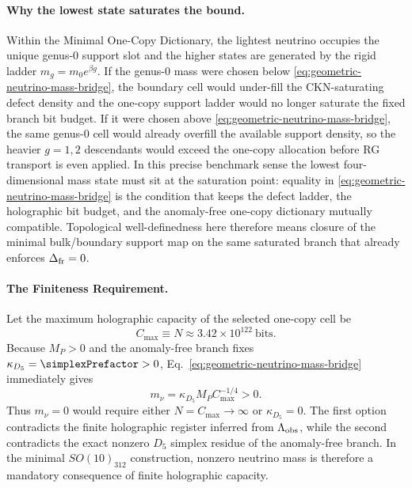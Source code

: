 \documentclass[11pt]{article}
\begin{document}
\paragraph{Why the lowest state saturates the bound.}
Within the Minimal One-Copy Dictionary, the lightest neutrino occupies the unique genus-$0$ support slot and the higher states are generated by the rigid ladder $m_g=m_0e^{\beta g}$. If the genus-$0$ mass were chosen below \eqref{eq:geometric-neutrino-mass-bridge}, the boundary cell would under-fill the CKN-saturating defect density and the one-copy support ladder would no longer saturate the fixed branch bit budget. If it were chosen above \eqref{eq:geometric-neutrino-mass-bridge}, the same genus-$0$ cell would already overfill the available support density, so the heavier $g=1,2$ descendants would exceed the one-copy allocation before RG transport is even applied. In this precise benchmark sense the lowest four-dimensional mass state must sit at the saturation point: equality in \eqref{eq:geometric-neutrino-mass-bridge} is the condition that keeps the defect ladder, the holographic bit budget, and the anomaly-free one-copy dictionary mutually compatible. Topological well-definedness here therefore means closure of the minimal bulk/boundary support map on the same saturated branch that already enforces $\Delta_{\rm fr}=0$.

\paragraph{The Finiteness Requirement.}
Let the maximum holographic capacity of the selected one-copy cell be
\begin{equation}
 C_{\max}\equiv N\approx 3.42\times10^{122}\ \text{bits}.
\end{equation}
Because $M_P>0$ and the anomaly-free branch fixes $\kappa_{D_5}=\simplexPrefactor>0$, Eq.~\eqref{eq:geometric-neutrino-mass-bridge} immediately gives
\begin{equation}
 m_\nu=\kappa_{D_5}M_PC_{\max}^{-1/4}>0.
\end{equation}
Thus $m_\nu=0$ would require either $N=C_{\max}\to\infty$ or $\kappa_{D_5}=0$. The first option contradicts the finite holographic register inferred from $\Lambda_{\rm obs}$, while the second contradicts the exact nonzero $D_5$ simplex residue of the anomaly-free branch. In the minimal $SO(10)_{312}$ construction, nonzero neutrino mass is therefore a mandatory consequence of finite holographic capacity.
\end{document}

